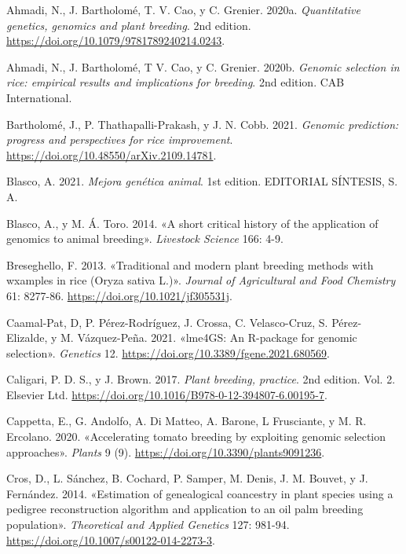 \documentclass[11pt,spanish,a4paper,oneside,]{book} %
\begin{document}
\hypertarget{refs}{}
\leavevmode\hypertarget{ref-cite:33}{}%
Ahmadi, N., J. Bartholomé, T. V. Cao, y C. Grenier. 2020a. \emph{Quantitative genetics, genomics and plant breeding}. 2nd edition. \url{https://doi.org/10.1079/9781789240214.0243}.

\leavevmode\hypertarget{ref-cite:45}{}%
Ahmadi, N., J. Bartholomé, T V. Cao, y C. Grenier. 2020b. \emph{Genomic selection in rice: empirical results and implications for breeding}. 2nd edition. CAB International.

\leavevmode\hypertarget{ref-cite:58}{}%
Bartholomé, J., P. Thathapalli-Prakash, y J. N. Cobb. 2021. \emph{Genomic prediction: progress and perspectives for rice improvement}. \url{https://doi.org/10.48550/arXiv.2109.14781}.

\leavevmode\hypertarget{ref-cite:21}{}%
Blasco, A. 2021. \emph{Mejora genética animal}. 1st edition. EDITORIAL SÍNTESIS, S. A.

\leavevmode\hypertarget{ref-cite:3}{}%
Blasco, A., y M. Á. Toro. 2014. «A short critical history of the application of genomics to animal breeding». \emph{Livestock Science} 166: 4-9.

\leavevmode\hypertarget{ref-cite:57}{}%
Breseghello, F. 2013. «Traditional and modern plant breeding methods with wxamples in rice (Oryza sativa L.)». \emph{Journal of Agricultural and Food Chemistry} 61: 8277-86. \url{https://doi.org/10.1021/jf305531j}.

\leavevmode\hypertarget{ref-cite:51}{}%
Caamal-Pat, D, P. Pérez-Rodríguez, J. Crossa, C. Velasco-Cruz, S. Pérez-Elizalde, y M. Vázquez-Peña. 2021. «lme4GS: An R-package for genomic selection». \emph{Genetics} 12. \url{https://doi.org/10.3389/fgene.2021.680569}.

\leavevmode\hypertarget{ref-cite:42}{}%
Caligari, P. D. S., y J. Brown. 2017. \emph{Plant breeding, practice}. 2nd edition. Vol. 2. Elsevier Ltd. \url{https://doi.org/10.1016/B978-0-12-394807-6.00195-7}.

\leavevmode\hypertarget{ref-cite:64}{}%
Cappetta, E., G. Andolfo, A. Di Matteo, A. Barone, L Frusciante, y M. R. Ercolano. 2020. «Accelerating tomato breeding by exploiting genomic selection approaches». \emph{Plants} 9 (9). \url{https://doi.org/10.3390/plants9091236}.

\leavevmode\hypertarget{ref-cite:48}{}%
Cros, D., L. Sánchez, B. Cochard, P. Samper, M. Denis, J. M. Bouvet, y J. Fernández. 2014. «Estimation of genealogical coancestry in plant species using a pedigree reconstruction algorithm and application to an oil palm breeding population». \emph{Theoretical and Applied Genetics} 127: 981-94. \url{https://doi.org/10.1007/s00122-014-2273-3}.
\end{document}
